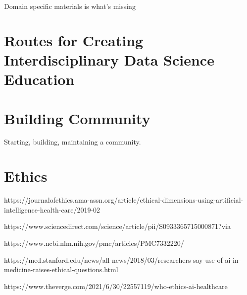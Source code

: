 \documentclass[../main.tex]{subfiles}
\begin{document}
        Domain specific materials is what's missing
        

    \section{Routes for Creating Interdisciplinary Data Science Education}

    \section{Building Community}

        Starting, building, maintaining a community.

    \section{Ethics}
    
    https://journalofethics.ama-assn.org/article/ethical-dimensions-using-artificial-intelligence-health-care/2019-02
    
    https://www.sciencedirect.com/science/article/pii/S0933365715000871?via%
    
    https://www.ncbi.nlm.nih.gov/pmc/articles/PMC7332220/
    
    https://med.stanford.edu/news/all-news/2018/03/researchers-say-use-of-ai-in-medicine-raises-ethical-questions.html

    https://www.theverge.com/2021/6/30/22557119/who-ethics-ai-healthcare
    
    
\end{document}
